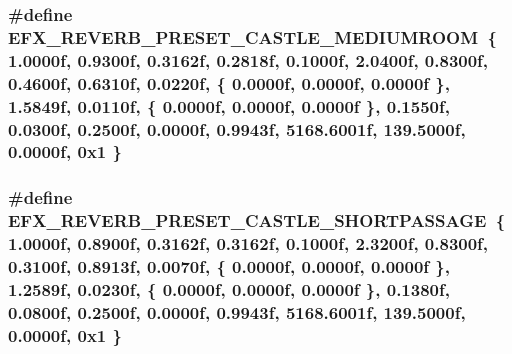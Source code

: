 \subsubsection[{\texorpdfstring{E\+F\+X\+\_\+\+R\+E\+V\+E\+R\+B\+\_\+\+P\+R\+E\+S\+E\+T\+\_\+\+C\+A\+S\+T\+L\+E\+\_\+\+M\+E\+D\+I\+U\+M\+R\+O\+OM}{EFX_REVERB_PRESET_CASTLE_MEDIUMROOM}}]{\setlength{\rightskip}{0pt plus 5cm}\#define E\+F\+X\+\_\+\+R\+E\+V\+E\+R\+B\+\_\+\+P\+R\+E\+S\+E\+T\+\_\+\+C\+A\+S\+T\+L\+E\+\_\+\+M\+E\+D\+I\+U\+M\+R\+O\+OM~\{ 1.\+0000f, 0.\+9300f, 0.\+3162f, 0.\+2818f, 0.\+1000f, 2.\+0400f, 0.\+8300f, 0.\+4600f, 0.\+6310f, 0.\+0220f, \{ 0.\+0000f, 0.\+0000f, 0.\+0000f \}, 1.\+5849f, 0.\+0110f, \{ 0.\+0000f, 0.\+0000f, 0.\+0000f \}, 0.\+1550f, 0.\+0300f, 0.\+2500f, 0.\+0000f, 0.\+9943f, 5168.\+6001f, 139.\+5000f, 0.\+0000f, 0x1 \}}\hypertarget{efx-presets_8h_a05f6c31dbfd01ed6ecaf580a5772a506}{}\label{efx-presets_8h_a05f6c31dbfd01ed6ecaf580a5772a506}
\subsubsection[{\texorpdfstring{E\+F\+X\+\_\+\+R\+E\+V\+E\+R\+B\+\_\+\+P\+R\+E\+S\+E\+T\+\_\+\+C\+A\+S\+T\+L\+E\+\_\+\+S\+H\+O\+R\+T\+P\+A\+S\+S\+A\+GE}{EFX_REVERB_PRESET_CASTLE_SHORTPASSAGE}}]{\setlength{\rightskip}{0pt plus 5cm}\#define E\+F\+X\+\_\+\+R\+E\+V\+E\+R\+B\+\_\+\+P\+R\+E\+S\+E\+T\+\_\+\+C\+A\+S\+T\+L\+E\+\_\+\+S\+H\+O\+R\+T\+P\+A\+S\+S\+A\+GE~\{ 1.\+0000f, 0.\+8900f, 0.\+3162f, 0.\+3162f, 0.\+1000f, 2.\+3200f, 0.\+8300f, 0.\+3100f, 0.\+8913f, 0.\+0070f, \{ 0.\+0000f, 0.\+0000f, 0.\+0000f \}, 1.\+2589f, 0.\+0230f, \{ 0.\+0000f, 0.\+0000f, 0.\+0000f \}, 0.\+1380f, 0.\+0800f, 0.\+2500f, 0.\+0000f, 0.\+9943f, 5168.\+6001f, 139.\+5000f, 0.\+0000f, 0x1 \}}\hypertarget{efx-presets_8h_a2bdb9324de8ff86ae224937cca35a78e}{}\label{efx-presets_8h_a2bdb9324de8ff86ae224937cca35a78e}
